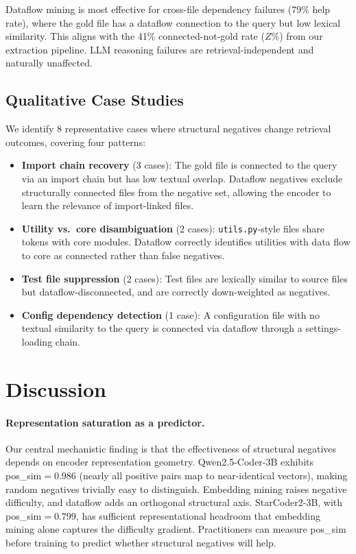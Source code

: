 \documentclass[11pt,a4paper]{article}
\begin{document}
Dataflow mining is most effective for cross-file dependency failures (79\% help rate), where the gold file has a dataflow connection to the query but low lexical similarity. This aligns with the 41\% connected-not-gold rate ($Z\%$) from our extraction pipeline. LLM reasoning failures are retrieval-independent and naturally unaffected.

\subsection{Qualitative Case Studies}

We identify 8 representative cases where structural negatives change retrieval outcomes, covering four patterns:

\begin{itemize}
\item \textbf{Import chain recovery} (3 cases): The gold file is connected to the query via an import chain but has low textual overlap. Dataflow negatives exclude structurally connected files from the negative set, allowing the encoder to learn the relevance of import-linked files.

\item \textbf{Utility vs.\ core disambiguation} (2 cases): \texttt{utils.py}-style files share tokens with core modules. Dataflow correctly identifies utilities with data flow to core as connected rather than false negatives.

\item \textbf{Test file suppression} (2 cases): Test files are lexically similar to source files but dataflow-disconnected, and are correctly down-weighted as negatives.

\item \textbf{Config dependency detection} (1 case): A configuration file with no textual similarity to the query is connected via dataflow through a settings-loading chain.
\end{itemize}

\section{Discussion}

\paragraph{Representation saturation as a predictor.} Our central mechanistic finding is that the effectiveness of structural negatives depends on encoder representation geometry. Qwen2.5-Coder-3B exhibits pos\_sim${}=0.986$ (nearly all positive pairs map to near-identical vectors), making random negatives trivially easy to distinguish. Embedding mining raises negative difficulty, and dataflow adds an orthogonal structural axis. StarCoder2-3B, with pos\_sim${}=0.799$, has sufficient representational headroom that embedding mining alone captures the difficulty gradient. Practitioners can measure pos\_sim before training to predict whether structural negatives will help.
\end{document}
